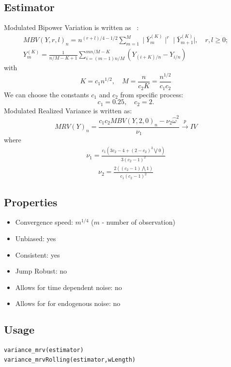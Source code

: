 \documentclass[letterpaper]{report}
\begin{document}
\subsection{Estimator}
Modulated Bipower Variation is written as ~\cite[Podolskij and Vetter, 2009]{Podolskij_Vetter}:
\begin{gather}
\label{MBV}
MBV(Y,r,l)_n = n^{(r+l)/4-1/2}\sum_{m=1}^M \mid \bar{Y}_m^{(K)}\mid^r \mid
\bar{Y}_{m+1}^{(K)}\mid, \quad r,l \geq 0;\\
Y_m^{(K)}=\frac{1}{n/M-K+1}\sum_{i=(m-1)n/M}^{mn/M-K}(Y_{(i+K)/n}-Y_{i/n})
\end{gather}
with
\begin{equation}
K=c_1 n^{1/2}, \quad M=\frac{n}{c_2K}=\frac{n^{1/2}}{c_1c_2}
\end{equation}
We can choose the constants $c_1$ and $c_2$ from specific process:
\begin{equation}
c_1 = 0.25, \quad
c_2 = 2.
\end{equation}
\noindent Modulated Realized Variance is written as:
\begin{equation}
MRV(Y)_n = \frac{c_1 c_2 MBV(Y,2,0)_n -\nu_2 \hat{\omega}^2}{\nu_1} \stackrel{p}{\to} IV
\end{equation}
where
\begin{gather}
\nu_1 = \frac{c_1(3c_2-4+(2-c_2)^3\bigvee 0)}{3(c_2-1)^2}
\end{gather}
\begin{gather}
\nu_2 = \frac{2((c_2-1)\bigwedge 1)}{c_1(c_2-1)^2}
\end{gather}
\subsection{Properties}
\begin{itemize}
\item Convergence speed: $m^{1/4}$ ($m$ - number of observation)
\item Unbiased: yes
\item Consistent: yes
\item Jump Robust: no
\item Allows for time dependent noise: no
\item Allows for for endogenous noise: no
\end{itemize}
  \subsection{Usage}
\begin{lstlisting}
variance_mrv(estimator)
variance_mrvRolling(estimator,wLength)
\end{lstlisting}
\end{document}
